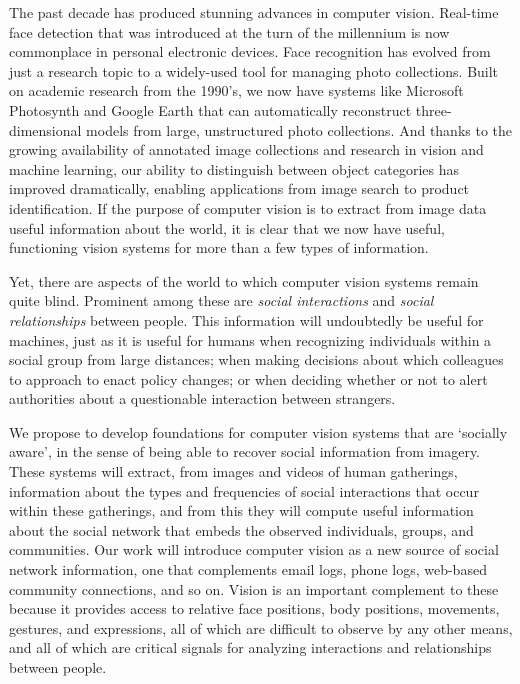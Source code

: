 \pagestyle{plain} 

 \label{sec:intro}

The past decade has produced stunning advances in computer vision. Real-time face detection that was introduced at the turn of the millennium is now commonplace in personal electronic devices. Face recognition has evolved from just a research topic to a widely-used tool for managing photo collections. Built on academic research from the 1990's, we now have systems like Microsoft Photosynth and Google Earth that can automatically reconstruct three-dimensional models from large, unstructured photo collections. And thanks to the growing availability of annotated image collections and research in vision and machine learning, our ability to distinguish between object categories has improved dramatically, enabling applications from image search to product identification. If the purpose of computer vision is to extract from image data useful information about the world, it is clear that we now have useful, functioning vision systems for more than a few types of information. 

Yet, there are aspects of the world to which computer vision systems remain quite blind. Prominent among these are \emph{social interactions} and \emph{social relationships} between people. This information will undoubtedly be useful for machines, just as it is useful for humans when recognizing individuals within a social group from large distances; when making decisions about which colleagues to approach to enact policy changes; or when deciding whether or not to alert authorities about a questionable interaction between strangers.

We propose to develop foundations for computer vision systems that are `socially aware', in the sense of being able to recover social information from imagery. These systems will extract, from images and videos of human gatherings,  information about the types and frequencies of social interactions that occur within these gatherings, and from this they will compute useful information about the social network that embeds the observed individuals, groups, and communities.  Our work will introduce computer vision as a new source of social network information, one that complements email logs, phone logs, web-based community connections, and so on. Vision is an important complement to these because it provides access to relative face positions, body positions, movements, gestures, and expressions, all of which are difficult to observe by any other means, and all of which are critical signals for analyzing interactions and relationships between people. 

